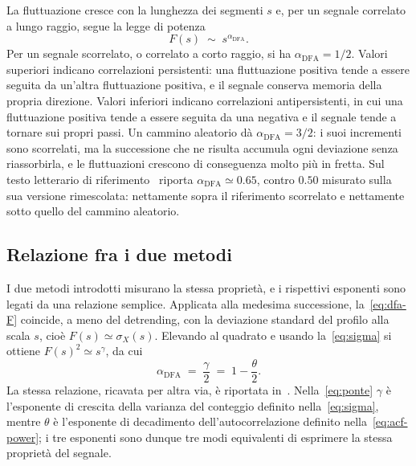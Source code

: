La fluttuazione cresce con la lunghezza dei segmenti $s$ e, per un segnale
correlato a lungo raggio, segue la legge di potenza
\begin{equation}
  F(s) \;\sim\; s^{\alpha_{\mathrm{DFA}}} .
  \label{eq:dfa-alpha}
\end{equation}
Per un segnale scorrelato, o correlato a corto raggio, si ha
$\alpha_{\mathrm{DFA}} = 1/2$. Valori superiori indicano correlazioni
persistenti: una fluttuazione positiva tende a essere seguita da un'altra
fluttuazione positiva, e il segnale conserva memoria della propria direzione.
Valori inferiori indicano correlazioni antipersistenti, in cui una fluttuazione
positiva tende a essere seguita da una negativa e il segnale tende a tornare
sui propri passi. Un cammino aleatorio dà $\alpha_{\mathrm{DFA}} = 3/2$: i suoi
incrementi sono scorrelati, ma la successione che ne risulta accumula ogni
deviazione senza riassorbirla, e le fluttuazioni crescono di conseguenza molto
più in fretta. Sul testo letterario di riferimento~\cite{lippi2019} riporta
$\alpha_{\mathrm{DFA}} \simeq 0.65$, contro $0.50$ misurato sulla sua versione
rimescolata: nettamente sopra il riferimento scorrelato e nettamente sotto
quello del cammino aleatorio.

\subsection{Relazione fra i due metodi}
\label{sec:ponte}

I due metodi introdotti misurano la stessa proprietà, e i rispettivi esponenti
sono legati da una relazione semplice. Applicata alla medesima successione,
la~\eqref{eq:dfa-F} coincide, a meno del detrending, con la deviazione standard
del profilo alla scala $s$, cioè $F(s) \simeq \sigma_X(s)$. Elevando al quadrato
e usando la~\eqref{eq:sigma} si ottiene $F(s)^2 \simeq s^{\gamma}$, da cui
\begin{equation}
  \alpha_{\mathrm{DFA}} \;=\; \frac{\gamma}{2} \;=\; 1 - \frac{\theta}{2} .
  \label{eq:ponte}
\end{equation}
La stessa relazione, ricavata per altra via, è riportata
in~\cite{kantelhardt2001}. Nella~\eqref{eq:ponte} $\gamma$ è l'esponente di
crescita della varianza del conteggio definito nella~\eqref{eq:sigma}, mentre
$\theta$ è l'esponente di decadimento dell'autocorrelazione definito
nella~\eqref{eq:acf-power}; i tre esponenti sono dunque tre modi equivalenti di
esprimere la stessa proprietà del segnale.

